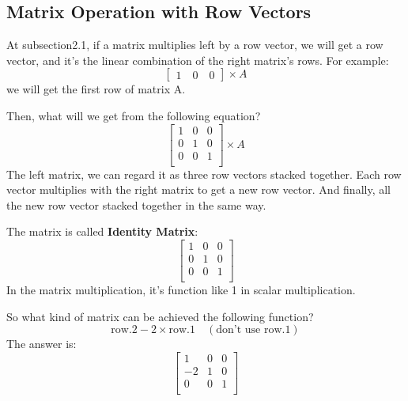     \subsection{Matrix Operation with Row Vectors}
        At subsection2.1, if a matrix multiplies left by a row vector, 
        we will get a row vector, and it's the linear combination of the right matrix's rows.
        For example:
                \begin{equation}
                    \begin{bmatrix}
                        1 \quad 0 \quad 0
                    \end{bmatrix}
                    \times
                    A
                \end{equation}
        we will get the first row of matrix A.

        Then, what will we get from the following equation?
                \begin{equation}
                    \begin{bmatrix}
                        1 & 0 & 0 \\
                        0 & 1 & 0 \\
                        0 & 0 & 1 \\
                    \end{bmatrix}
                    \times
                    A
                \end{equation}
        The left matrix, we can regard it as three row vectors stacked together.
        Each row vector multiplies with the right matrix to get a new row vector.
        And finally, all the new row vector stacked together in the same way.

        The matrix is called \textbf{Identity Matrix}:
                \begin{equation}
                    \begin{bmatrix}
                        1 & 0 & 0 \\
                        0 & 1 & 0 \\
                        0 & 0 & 1 \\
                    \end{bmatrix}
                \end{equation}
        In the matrix multiplication, it's function like 1 in scalar multiplication.

        So what kind of matrix can be achieved the following function?
                \begin{equation}
                    \text{row.2} - 2 \times \text{row.1}\quad (\text{don't use row.1})
                \end{equation}
        The answer is:
                \begin{equation}
                    \begin{bmatrix}
                        1 & 0 & 0 \\
                        -2 & 1 & 0 \\
                        0 & 0 & 1 \\
                    \end{bmatrix}
                \end{equation}
        
